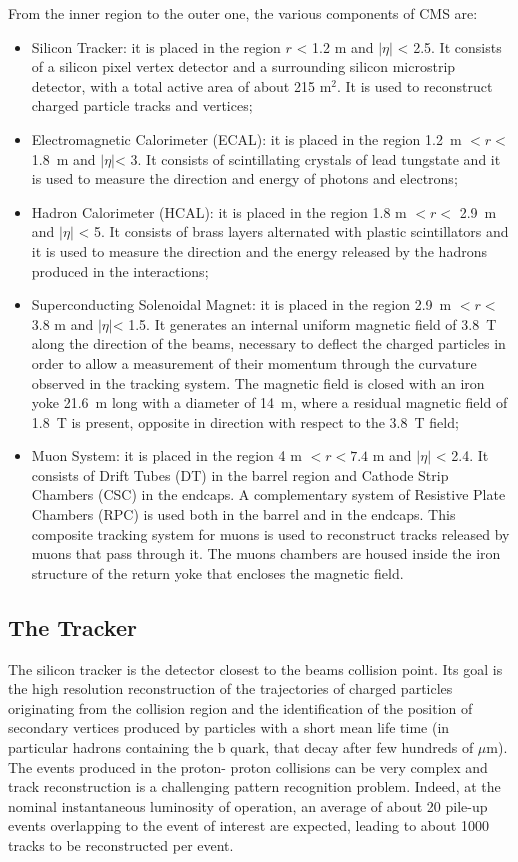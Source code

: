 From the inner region to the outer one, the various components of CMS are:
\begin{itemize}
\item Silicon Tracker: it is placed in the region $r$ < 1.2 m and $|\eta|$ < 2.5. It consists of
a silicon pixel vertex detector and a surrounding silicon microstrip detector, with a
total active area of about 215 m$^2$. It is used to reconstruct charged particle tracks
and vertices;
\item Electromagnetic Calorimeter (ECAL): it is placed in the region 1.2~m $< r <$
1.8~m and $|\eta|$< 3. It consists of scintillating crystals of lead
tungstate  and it is used to measure the direction and energy of photons and electrons;
\item Hadron Calorimeter (HCAL): it is placed in the region 1.8 m $< r <$ 2.9~m and
$|\eta|$ < 5. It consists of brass layers alternated with plastic scintillators and it is used
to measure the direction and the energy released by the hadrons produced in the
interactions;
\item Superconducting Solenoidal Magnet: it is placed in the region 2.9~m $< r <$
3.8 m and  $|\eta|$< 1.5. It generates an internal uniform magnetic field of 3.8~T along
the direction of the beams, necessary to deflect the charged particles in order to
allow a measurement of their momentum through the curvature observed in the
tracking system. The magnetic field is closed with an iron yoke 21.6~m long with a
diameter of 14~m, where a residual magnetic field of 1.8~T is present, opposite
in direction with respect to the 3.8~T field;
\item Muon System: it is placed in the region 4 m $< r < 7.4$ m and $|\eta|$ < 2.4. It consists
of Drift Tubes (DT) in the barrel region and Cathode Strip Chambers (CSC) in the
endcaps. A complementary system of Resistive Plate Chambers (RPC) is used both
in the barrel and in the endcaps. This composite tracking system for muons is used
to reconstruct tracks released by muons that pass through it. The muons chambers
are housed inside the iron structure of the return yoke that encloses the magnetic
field.
\end{itemize}

\subsection*{The Tracker}
The silicon tracker is the detector closest to the beams collision point. Its goal is
the high resolution reconstruction of the trajectories of charged particles originating
from the collision region and the identification of the position of secondary vertices
produced by particles with a short mean life time (in particular hadrons containing the
b quark, that decay after few hundreds of $\mu$m). The events produced in the proton-
proton collisions can be very complex and track reconstruction is a
challenging pattern
recognition problem. Indeed, at the nominal instantaneous luminosity of operation,
an average of about 20 pile-up events overlapping to the event of interest are expected,
leading to about 1000 tracks to be reconstructed per event.

